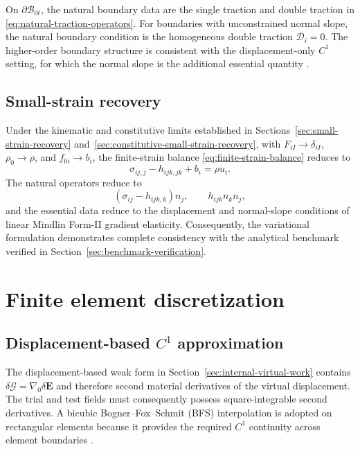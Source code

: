 \documentclass[preprint,12pt]{elsarticle}
\begin{document}
On $\partial\mathcal{B}_{0t}$, the natural boundary data are the single
traction and double traction in \eqref{eq:natural-traction-operators}. For
boundaries with unconstrained normal slope, the natural boundary condition is
the homogeneous double traction $\mathcal{D}_i=0$. The
higher-order boundary structure is consistent with the displacement-only
$C^1$ setting, for which the normal slope is the additional essential
quantity \cite{Toupin1962,Germain1973,ShuKingFleck1999}.

\subsection{Small-strain recovery}
\label{sec:variational-small-strain-recovery}

Under the kinematic and constitutive limits established in Sections~\ref{sec:small-strain-recovery} and~\ref{sec:constitutive-small-strain-recovery}, with $F_{iI}\longrightarrow\delta_{iI}$, $\rho_0\longrightarrow\rho$, and $f_{0i}\longrightarrow b_i$, the finite-strain balance \eqref{eq:finite-strain-balance} reduces to
\begin{equation}
 \sigma_{ij,j}-h_{ijk,jk}+b_i
 =\rho\ddot{u}_i.
 \label{eq:small-strain-balance}
\end{equation}
The natural operators reduce to
\begin{equation}
 \left(\sigma_{ij}-h_{ijk,k}\right)n_j,
 \qquad
 h_{ijk}n_kn_j,
 \label{eq:small-strain-natural-operators}
\end{equation}
and the essential data reduce to the displacement and normal-slope
conditions of linear Mindlin Form-II gradient elasticity. Consequently, the
variational formulation demonstrates complete consistency with the
analytical benchmark verified in Section~\ref{sec:benchmark-verification}.

\section{Finite element discretization}
\label{sec:finite-element-discretization}

\subsection{Displacement-based \texorpdfstring{$C^1$}{C1} approximation}
\label{sec:c1-bfs-approximation}

The displacement-based weak form in Section~\ref{sec:internal-virtual-work}
contains $\delta\bm{\mathcal{G}}=\nabla_0\delta\mathbf{E}$ and therefore
second material derivatives of the virtual displacement. The trial and
test fields must consequently possess square-integrable second
derivatives. A bicubic Bogner--Fox--Schmit (BFS) interpolation is adopted
on rectangular elements because it provides the required $C^1$
continuity across element boundaries \cite{BognerFoxSchmit1966,ShuKingFleck1999}.
\end{document}

